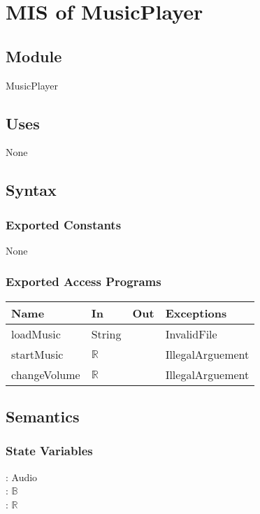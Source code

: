 \documentclass[12pt, titlepage]{article}
\begin{document}
\section{MIS of MusicPlayer}

\subsection{Module}

MusicPlayer

\subsection{Uses}

None

\subsection{Syntax}

\subsubsection{Exported Constants}
None

\subsubsection{Exported Access Programs}

\begin{center}
\begin{tabular}{p{4cm} p{4cm} p{4cm} p{2cm}}
\hline
\textbf{Name} & \textbf{In} & \textbf{Out} & \textbf{Exceptions} \\
\hline
loadMusic & String &  & InvalidFile \\
\hline
startMusic & $\mathbb{R}$ &  & IllegalArguement \\
\hline
changeVolume & $\mathbb{R}$ &  & IllegalArguement \\
\hline
\end{tabular}
\end{center}

\subsection{Semantics}

\subsubsection{State Variables}
: Audio\\
: $\mathbb{B}$\\
: $\mathbb{R}$\\
\end{document}
